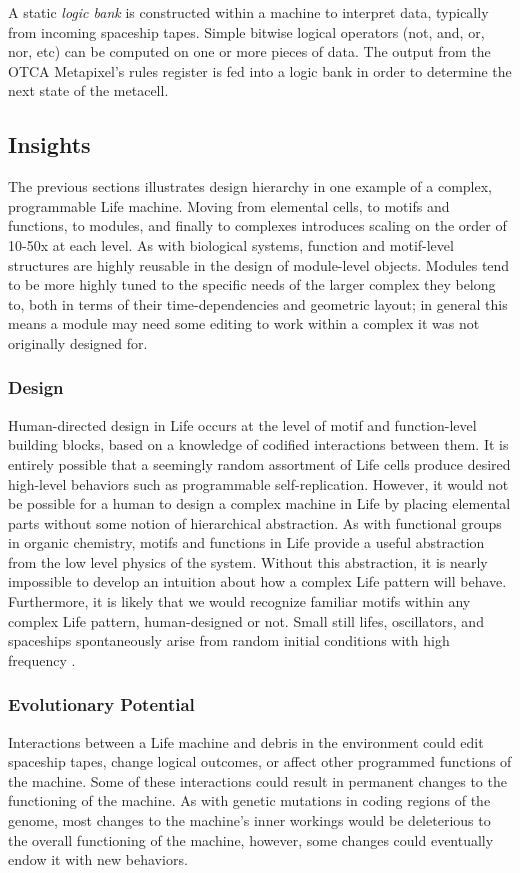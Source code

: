 {A static \textit{logic bank} is constructed within a machine to interpret data, typically from incoming spaceship tapes.  Simple bitwise logical operators (not, and, or, nor, etc) can be computed on one or more pieces of data.  The output from the OTCA Metapixel's rules register is fed into a logic bank in order to determine the next state of the metacell.

\subsection{Insights}

The previous sections illustrates design hierarchy in one example of a complex, programmable Life machine.  Moving from elemental cells, to motifs and functions, to modules, and finally to complexes introduces scaling on the order of 10-50x at each level.  As with biological systems, function and motif-level structures are highly reusable in the design of module-level objects.  Modules tend to be more highly tuned to the specific needs of the larger complex they belong to, both in terms of their time-dependencies and geometric layout; in general this means a module may need some editing to work within a complex it was not originally designed for.

\subsubsection{Design}

Human-directed design in Life occurs at the level of motif and function-level building blocks, based on a knowledge of codified interactions between them.  It is entirely possible that a seemingly random assortment of Life cells produce desired high-level behaviors such as programmable self-replication.  However, it would not be possible for a human to design a complex machine in Life by placing elemental parts without some notion of hierarchical abstraction.  As with functional groups in organic chemistry, motifs and functions in Life provide a useful abstraction from the low level physics of the system.  Without this abstraction, it is nearly impossible to develop an intuition about how a complex Life pattern will behave.  Furthermore, it is likely that we would recognize familiar motifs within any complex Life pattern, human-designed or not.  Small still lifes, oscillators, and spaceships spontaneously arise from random initial conditions with high frequency \cite{Flammenkamp2004}.

\subsubsection{Evolutionary Potential}

Interactions between a Life machine and debris in the environment could edit spaceship tapes, change logical outcomes, or affect other programmed functions of the machine.  Some of these interactions could result in permanent changes to the functioning of the machine.  As with genetic mutations in coding regions of the genome, most changes to the machine's inner workings would be deleterious to the overall functioning of the machine, however, some changes could eventually endow it with new behaviors.

}
